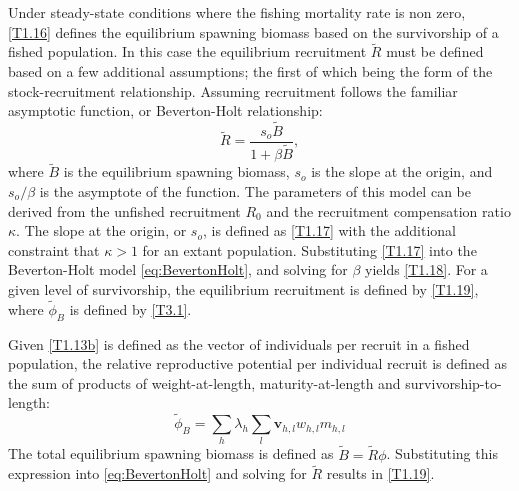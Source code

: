 \documentclass[12pt,letterpaper]{article}
\begin{document}
    Under steady-state conditions where the fishing mortality rate is non zero, \eqref{T1.16} defines the equilibrium spawning biomass based on the survivorship of a fished population.  In this case the equilibrium recruitment $\tilde{R}$ must be defined based on a few additional assumptions; the first of which being the form of the stock-recruitment relationship.  Assuming recruitment follows the familiar asymptotic function, or Beverton-Holt relationship:
    \begin{equation} \label{eq:BevertonHolt}
      \tilde{R} = \frac{s_o \tilde{B}}{1 + \beta \tilde{B}},
    \end{equation}
    where $\tilde{B}$ is the equilibrium spawning biomass, $s_o$ is the slope at the origin, and $s_o/\beta$ is the asymptote of the function. The parameters of this model can be derived from the unfished recruitment $R_0$ and the recruitment compensation ratio $\kappa$.  The slope at the origin, or $s_o$, is defined as \eqref{T1.17} with the additional constraint that $\kappa > 1$ for an extant population.  Substituting \eqref{T1.17} into the Beverton-Holt model \eqref{eq:BevertonHolt}, and solving  for $\beta$ yields \eqref{T1.18}.  For a given level of survivorship, the equilibrium recruitment is defined by \eqref{T1.19}, where $\tilde{\phi}_B$ is defined by \eqref{T3.1}.

    Given \eqref{T1.13b} is defined as the vector of individuals per recruit in a fished population, the relative reproductive potential per individual recruit is defined as the sum of products of weight-at-length, maturity-at-length and survivorship-to-length:
    \[
    \tilde{\phi}_B = \sum_h \lambda_h \sum_l  \bm{v}_{h,l} w_{h,l} m_{h,l}
    \]
    The total equilibrium spawning biomass is defined as $\tilde{B} = \tilde{R} \phi$.  Substituting this expression into \eqref{eq:BevertonHolt} and solving for $\tilde{R}$ results in \eqref{T1.19}.
\end{document}
